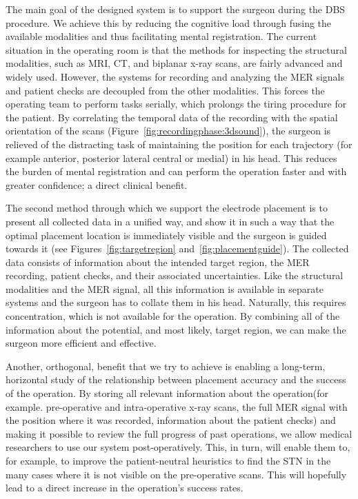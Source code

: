 \documentclass{egpubl}
\begin{document}
The main goal of the designed system is to support the surgeon during the DBS procedure. We achieve this by reducing the cognitive load through fusing the available modalities and thus facilitating mental registration. The current situation in the operating room is that the methods for inspecting the structural modalities, such as MRI, CT, and biplanar x-ray scans, are fairly advanced and widely used. However, the systems for recording and analyzing the MER signals and patient checks are decoupled from the other modalities. This forces the operating team to perform tasks serially, which prolongs the tiring procedure for the patient. By correlating the temporal data of the recording with the spatial orientation of the scans (Figure~\ref{fig:recordingphase:3dsound}), the surgeon is relieved of the distracting task of maintaining the position for each trajectory (for example anterior, posterior lateral central or medial) in his head. This reduces the burden of mental registration and can perform the operation faster and with greater confidence; a direct clinical benefit.

The second method through which we support the electrode placement is to present all collected data in a unified way, and show it in such a way that the optimal placement location is immediately visible and the surgeon is guided towards it (see Figures~\ref{fig:targetregion} and~\ref{fig:placementguide}). The collected data consists of information about the intended target region, the MER recording, patient checks, and their associated uncertainties. Like the structural modalities and the MER signal, all this information is available in separate systems and the surgeon has to collate them in his head. Naturally, this requires concentration, which is not available for the operation. By combining all of the information about the potential, and most likely, target region, we can make the surgeon more efficient and effective. 

Another, orthogonal, benefit that we try to achieve is enabling a long-term, horizontal study of the relationship between placement accuracy and the success of the operation. By storing all relevant information about the operation(for example. pre-operative and intra-operative x-ray scans, the full MER signal with the position where it was recorded, information about the patient checks) and making it possible to review the full progress of past operations, we allow medical researchers to use our system post-operatively. This, in turn, will enable them to, for example, to improve the patient-neutral heuristics to find the STN in the many cases where it is not visible on the pre-operative scans. This will hopefully lead to a direct increase in the operation's success rates.
\end{document}
